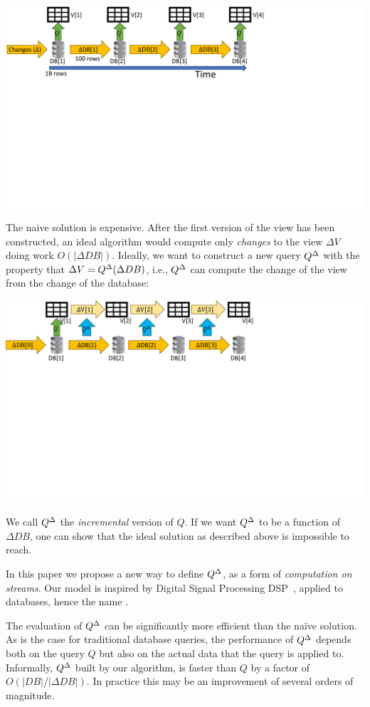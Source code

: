 \includegraphics[trim={0 4.8in 3.7in 0},clip,scale=.34]{view.pdf}

The naive solution is expensive.  After the first version of the view
has been constructed, an ideal algorithm would compute only
\emph{changes} to the view $\Delta V$ doing work $O(|\Delta DB|)$.
Ideally, we want to construct a new query ${Q}^{\Delta}$ with the property
that $\Delta V = {Q}^{\Delta}(\Delta DB)$, i.e., ${Q}^{\Delta}$ can compute the
change of the view from the change of the database:

\noindent \includegraphics[trim={0 5.2in 4.1in 0},clip,scale=.35]{incview.pdf}

We call ${Q}^{\Delta}$ the \emph{incremental} version of $Q$.  If we want
${Q}^{\Delta}$ to be a function of $\Delta DB$, one can show that the ideal
solution as described above is impossible to reach.

In this paper we propose a new way to define ${Q}^{\Delta}$, as a form of
\emph{computation on streams}.  Our model is inspired by Digital
Signal Processing DSP~\cite{rabiner-book75}, applied to databases,
hence the name \dbsp.

The evaluation of ${Q}^{\Delta}$ can be significantly more efficient than
the na\"ive solution.  As is the case for traditional database
queries, the performance of ${Q}^{\Delta}$ depends both on the query $Q$
but also on the actual data that the query is applied to.  Informally,
${Q}^{\Delta}$ built by our algorithm, is faster than $Q$ by a factor of
$O(|DB| / |\Delta DB|)$.  In practice this may be an improvement of
several orders of magnitude.

